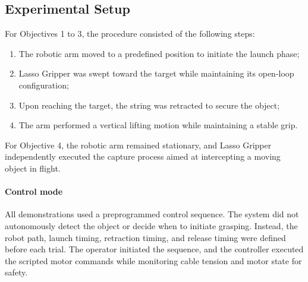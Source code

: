 \subsection{Experimental Setup}
For Objectives 1 to 3, the procedure consisted of the following steps:

    \begin{enumerate}
        \item The robotic arm moved to a predefined position to initiate the launch phase;

        \item Lasso Gripper was swept toward the target while maintaining its open-loop configuration;

        \item Upon reaching the target, the string was retracted to secure the object;

        \item The arm performed a vertical lifting motion while maintaining a stable grip.
    \end{enumerate}
For Objective 4, the robotic arm remained stationary, and Lasso Gripper independently executed the capture process aimed at intercepting a moving object in flight.
\paragraph{Control mode}
All demonstrations used a preprogrammed control sequence. The system did not autonomously detect the object or decide when to initiate grasping. Instead, the robot path, launch timing, retraction timing, and release timing were defined before each trial. The operator initiated the sequence, and the controller executed the scripted motor commands while monitoring cable tension and motor state for safety.
